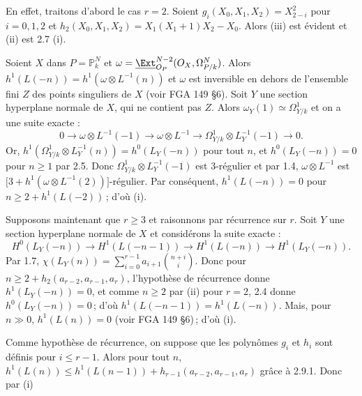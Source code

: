 
En
effet, traitons d'abord le cas \(r=2\). Soient \(g_i(X_0,X_1,X_2)=X_{2-i}^2\) pour \(i=0,1,2\) et \(h_2(X_0,X_1,X_2)=X_1(X_1+1)X_2-X_0\). Alors (iii) est évident et (ii) est 2.7 (i).

Soient \(X\) dans \(P=\mathbb P_k^N\) et \(\omega=\underline{\Ext}^{N-2}_{{O}_P}({O}_X,\Omega^N_{P/k})\). Alors \(h^1(L(-n))=h^1(\omega\otimes L^{-1}(n))\) et \(\omega\) est inversible en dehors de l'ensemble fini \(Z\) des points singuliers de \(X\) (voir FGA 149 \S 6). Soit \(Y\) une section hyperplane normale de \(X\), qui ne contient pas \(Z\). Alors \(\omega_Y(1)\simeq\Omega^1_{Y/k}\) et on a une suite exacte :
\[
0\longrightarrow \omega\otimes L^{-1}(-1)
\longrightarrow \omega\otimes L^{-1}
\longrightarrow \Omega^1_{Y/k}\otimes L_Y^{-1}(-1)
\longrightarrow0.
\]
Or, \(h^1(\Omega^1_{Y/k}\otimes L_Y^{-1}(n))=h^0(L_Y(-n))\) pour tout \(n\), et \(h^0(L_Y(-n))=0\) pour \(n\ge1\) par 2.5. Donc \(\Omega^1_{Y/k}\otimes L_Y^{-1}(-1)\) est 3-régulier et par 1.4, \(\omega\otimes L^{-1}\) est \(\bigl[3+h^1(\omega\otimes L^{-1}(2))\bigr]\)-régulier. Par conséquent, \(h^1(L(-n))=0\) pour \(n\ge2+h^1(L(-2))\)\,; d'où (i).

Supposons maintenant que \(r\ge3\) et raisonnons par récurrence sur \(r\). Soit \(Y\) une section hyperplane normale de \(X\) et considérons la suite exacte :
\[
H^0(L_Y(-n))\longrightarrow H^1(L(-n-1))
\longrightarrow H^1(L(-n))\longrightarrow H^1(L_Y(-n)).
\tag{2.9.1}
\]
Par 1.7, \(\chi(L_Y(n))=\sum_{i=0}^{r-1}a_{i+1}\binom{n+i}{i}\). Donc pour \(n\ge2+h_2(a_{r-2},a_{r-1},a_r)\), l'hypothèse de récurrence donne \(h^1(L_Y(-n))=0\), et comme \(n\ge2\) par (ii) pour \(r=2\), 2.4 donne \(h^0(L_Y(-n))=0\)\,; d'où \(h^1(L(-n-1))=h^1(L(-n))\). Mais, pour \(n\gg0\), \(h^1(L(n))=0\) (voir FGA 149 \S 6)\,; d'où (i).

Comme hypothèse de récurrence, on suppose que les polynômes \(g_i\) et \(h_i\) sont définis pour \(i\le r-1\). Alors pour tout \(n\), \(h^1(L(n))\le h^1(L(n-1))+h_{r-1}(a_{r-2},a_{r-1},a_r)\) grâce à 2.9.1. Donc par (i) 
